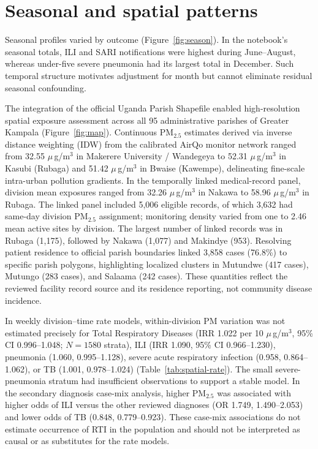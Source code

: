 \documentclass[12pt,a4paper]{report}
\newcommand{\pmfive}{PM$_{2.5}$}
\newcommand{\ugm}{\ensuremath{\mu}\,g/m$^3$}
\begin{document}
\section{Seasonal and spatial patterns}
Seasonal profiles varied by outcome (Figure~\ref{fig:season}). In the notebook's seasonal totals, ILI and SARI notifications were highest during June--August, whereas under-five severe pneumonia had its largest total in December. Such temporal structure motivates adjustment for month but cannot eliminate residual seasonal confounding.

The integration of the official Uganda Parish Shapefile enabled high-resolution spatial exposure assessment across all 95 administrative parishes of Greater Kampala (Figure~\ref{fig:map}). Continuous \pmfive{} estimates derived via inverse distance weighting (IDW) from the calibrated AirQo monitor network ranged from 32.55 \ugm{} in Makerere University / Wandegeya to 52.31 \ugm{} in Kasubi (Rubaga) and 51.42 \ugm{} in Bwaise (Kawempe), delineating fine-scale intra-urban pollution gradients. In the temporally linked medical-record panel, division mean exposures ranged from 32.26 \ugm{} in Nakawa to 58.96 \ugm{} in Rubaga. The linked panel included 5,006 eligible records, of which 3,632 had same-day division \pmfive{} assignment; monitoring density varied from one to 2.46 mean active sites by division. The largest number of linked records was in Rubaga (1,175), followed by Nakawa (1,077) and Makindye (953). Resolving patient residence to official parish boundaries linked 3,858 cases (76.8\%) to specific parish polygons, highlighting localized clusters in Mutundwe (417 cases), Mutungo (283 cases), and Salaama (242 cases). These quantities reflect the reviewed facility record source and its residence reporting, not community disease incidence.

In weekly division--time rate models, within-division PM variation was not estimated precisely for Total Respiratory Diseases (IRR 1.022 per 10 \ugm{}, 95\% CI 0.996--1.048; $N=1580$ strata), ILI (IRR 1.090, 95\% CI 0.966--1.230), pneumonia (1.060, 0.995--1.128), severe acute respiratory infection (0.958, 0.864--1.062), or TB (1.001, 0.978--1.024) (Table~\ref{tab:spatial-rate}). The small severe-pneumonia stratum had insufficient observations to support a stable model. In the secondary diagnosis case-mix analysis, higher \pmfive{} was associated with higher odds of ILI versus the other reviewed diagnoses (OR 1.749, 1.490--2.053) and lower odds of TB (0.848, 0.779--0.923). These case-mix associations do not estimate occurrence of RTI in the population and should not be interpreted as causal or as substitutes for the rate models.
\end{document}
